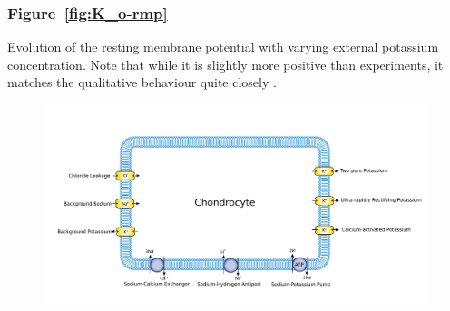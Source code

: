 \subsubsection*{Figure~\ref{fig:K_o-rmp}}
Evolution of the resting membrane potential with varying external
potassium concentration. Note that while it is slightly more positive
than experiments, it matches the qualitative behaviour quite
closely \citep{Clarketal2011}.

\clearpage
\setlength{\textwidth}{18cm}
\setlength{\oddsidemargin}{0in}
\setlength{\evensidemargin}{0in}

\begin{landscape}
\begin{figure}
  \centering
  \includegraphics[width=\textwidth]
  {../images/pdf/chondrocyte-model-cellml}
  \caption{}
  \label{fig:chondrocyte-model}
\end{figure}
\end{landscape}

